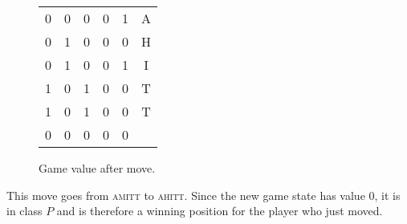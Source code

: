 \documentclass[11pt, reqno]{amsart}
\begin{document}
\begin{problem}[11]
\begin{multicols}{2}
\begin{enumarabic}
        \begin{figure}[H]
          \begin{tabular}{c@{\,}c@{\,}c@{\,}c@{\,}c@{\,}|c}
            0 & 0 & 0 & 0 & 1 & A\\
            0 & 1 & 0 & 0 & 0 & H\\
            0 & 1 & 0 & 0 & 1 & I\\
            1 & 0 & 1 & 0 & 0 & T\\
            1 & 0 & 1 & 0 & 0 & T\\
            \midrule
            0 & 0 & 0 & 0 & 0  
          \end{tabular}
          \caption{Game value after move.}
        \end{figure}
        \step
        This move goes from \textsc{amitt} to \textsc{ahitt}.
        Since the new game state has value $0$, it is in class $P$
        and is therefore a winning position for the player who just moved.
    \end{enumarabic}
  \end{multicols}
\end{problem}
\end{document}

